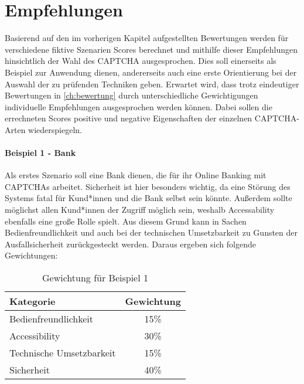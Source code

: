 \chapter{Empfehlungen}
\label{ch:empfehlung}

Basierend auf den im vorherigen Kapitel aufgestellten Bewertungen werden für verschiedene fiktive Szenarien Scores berechnet 
und mithilfe dieser Empfehlungen hinsichtlich der Wahl des CAPTCHA ausgesprochen. 
Dies soll einerseits als Beispiel zur Anwendung dienen, 
andererseits auch eine erste Orientierung bei der Auswahl der zu prüfenden Techniken geben. 
Erwartet wird, dass trotz eindeutiger Bewertungen in \autoref{ch:bewertung} durch unterschiedliche Gewichtigungen
individuelle Empfehlungen ausgesprochen werden können. 
Dabei sollen die errechneten Scores positive und negative Eigenschaften der einzelnen CAPTCHA-Arten wiederspiegeln.

\subsubsection*{Beispiel 1 - Bank}
Als erstes Szenario soll eine Bank dienen, die für ihr Online Banking mit CAPTCHAs arbeitet.
Sicherheit ist hier besonders wichtig, 
da eine Störung des Systems fatal für Kund*innen und die Bank selbst sein könnte.
Außerdem sollte möglichst allen Kund*innen der Zugriff möglich sein, 
weshalb Accessability ebenfalls eine große Rolle spielt.
Aus diesem Grund kann in Sachen Bedienfreundlichkeit 
und auch bei der technischen Umsetzbarkeit zu Gunsten der Ausfallsicherheit zurückgesteckt werden.
Daraus ergeben sich folgende Gewichtungen:

\begin{table}[h!]
    \caption{Gewichtung für Beispiel 1}
    \begin{center}
        \begin{tabular}{l|c}
            Kategorie                       & Gewichtung \\\hline
            Bedienfreundlichkeit            & 15\%         \\
            Accessibility                   & 30\%        \\
            Technische Umsetzbarkeit        & 15\%         \\
            Sicherheit                      & 40\%         
        \end{tabular}
    \end{center}
\end{table}

